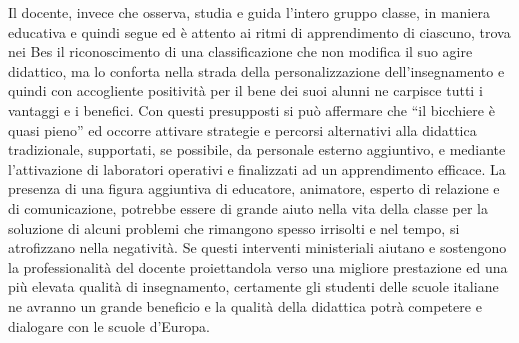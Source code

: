 Il docente, invece che osserva, studia e guida l'intero gruppo classe, in maniera educativa e quindi segue ed è attento ai ritmi di apprendimento di ciascuno, trova nei Bes il riconoscimento di una classificazione che non modifica il suo agire didattico, ma lo conforta nella strada della personalizzazione dell'insegnamento e quindi con accogliente positività per il bene dei suoi alunni ne carpisce tutti i vantaggi e i benefici. Con questi presupposti si può affermare che “il bicchiere è quasi pieno” ed occorre attivare strategie e percorsi alternativi alla didattica tradizionale, supportati, se possibile, da personale esterno aggiuntivo, e mediante l'attivazione di laboratori operativi e finalizzati ad un apprendimento efficace.
La presenza di una figura aggiuntiva di educatore, animatore, esperto di relazione e di comunicazione, potrebbe essere di grande aiuto nella vita della classe per la soluzione di alcuni problemi che rimangono spesso irrisolti e nel tempo, si atrofizzano nella negatività.
Se questi interventi ministeriali aiutano e sostengono la professionalità del docente proiettandola verso una migliore prestazione ed una più elevata qualità di insegnamento, certamente gli studenti delle scuole italiane ne avranno un grande beneficio e la qualità della didattica potrà competere e dialogare con le scuole d'Europa.